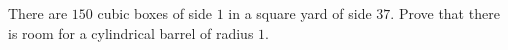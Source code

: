 There are $150$ cubic boxes of side $1$ in a square yard of side $37$. Prove that there is room for a cylindrical barrel of radius $1$.
